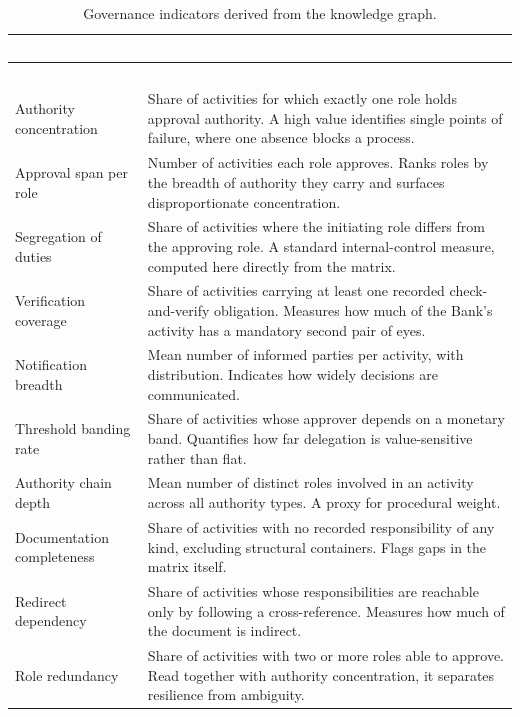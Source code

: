 \begin{longtable}{|p{}|p{}|}
\caption{Governance indicators derived from the knowledge graph.}\label{tab:govkpi}\\
\hline
\rowcolor{thesisgreen}\textcolor{white}{\textbf{Indicator}} & \textcolor{white}{\textbf{Definition and interpretation}} \\
\hline
\endfirsthead
\hline
\rowcolor{thesisgreen}\textcolor{white}{\textbf{Indicator}} & \textcolor{white}{\textbf{Definition and interpretation}} \\
\hline
\endhead
Authority concentration & Share of activities for which exactly one role holds approval authority. A high value identifies single points of failure, where one absence blocks a process. \\ \hline
Approval span per role & Number of activities each role approves. Ranks roles by the breadth of authority they carry and surfaces disproportionate concentration. \\ \hline
Segregation of duties & Share of activities where the initiating role differs from the approving role. A standard internal-control measure, computed here directly from the matrix. \\ \hline
Verification coverage & Share of activities carrying at least one recorded check-and-verify obligation. Measures how much of the Bank's activity has a mandatory second pair of eyes. \\ \hline
Notification breadth & Mean number of informed parties per activity, with distribution. Indicates how widely decisions are communicated. \\ \hline
Threshold banding rate & Share of activities whose approver depends on a monetary band. Quantifies how far delegation is value-sensitive rather than flat. \\ \hline
Authority chain depth & Mean number of distinct roles involved in an activity across all authority types. A proxy for procedural weight. \\ \hline
Documentation completeness & Share of activities with no recorded responsibility of any kind, excluding structural containers. Flags gaps in the matrix itself. \\ \hline
Redirect dependency & Share of activities whose responsibilities are reachable only by following a cross-reference. Measures how much of the document is indirect. \\ \hline
Role redundancy & Share of activities with two or more roles able to approve. Read together with authority concentration, it separates resilience from ambiguity. \\ \hline
\end{longtable}

